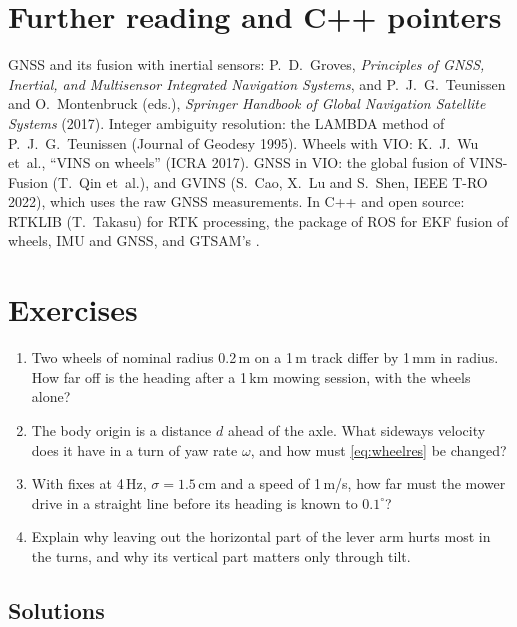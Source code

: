 \section*{Further reading and C++ pointers}

GNSS and its fusion with inertial sensors: P.~D.~Groves, \emph{Principles
of GNSS, Inertial, and Multisensor Integrated Navigation Systems}, and
P.~J.~G.~Teunissen and O.~Montenbruck (eds.), \emph{Springer Handbook of
Global Navigation Satellite Systems} (2017). Integer ambiguity
resolution: the LAMBDA method of P.~J.~G.~Teunissen (Journal of Geodesy
1995). Wheels with VIO: K.~J.~Wu et~al., ``VINS on wheels'' (ICRA 2017).
GNSS in VIO: the global fusion of VINS-Fusion (T.~Qin et~al.), and
GVINS (S.~Cao, X.~Lu and S.~Shen, IEEE T-RO 2022), which uses the raw
GNSS measurements. In C++ and open source: RTKLIB (T.~Takasu) for RTK
processing, the  package of ROS for EKF fusion
of wheels, IMU and GNSS, and GTSAM's .

\FloatBarrier
\section*{Exercises}

\begin{enumerate}[label=\textbf{14.\arabic*},ref=14.\arabic*]
\item\label{ex:14radius} Two wheels of nominal radius 0.2\,m on a 1\,m
  track differ by 1\,mm in radius. How far off is the heading after a
  1\,km mowing session, with the wheels alone?
\item\label{ex:14offset} The body origin is a distance $d$ ahead of the
  axle. What sideways velocity does it have in a turn of yaw rate
  $\omega$, and how must \eqref{eq:wheelres} be changed?
\item\label{ex:14line} With fixes at 4\,Hz, $\sigma=1.5$\,cm and a speed
  of 1\,m/s, how far must the mower drive in a straight line before its
  heading is known to $0.1^\circ$?
\item\label{ex:14lever} Explain why leaving out the horizontal part of the
  lever arm hurts most in the turns, and why its vertical part matters
  only through tilt.
\end{enumerate}

\subsection*{Solutions}

